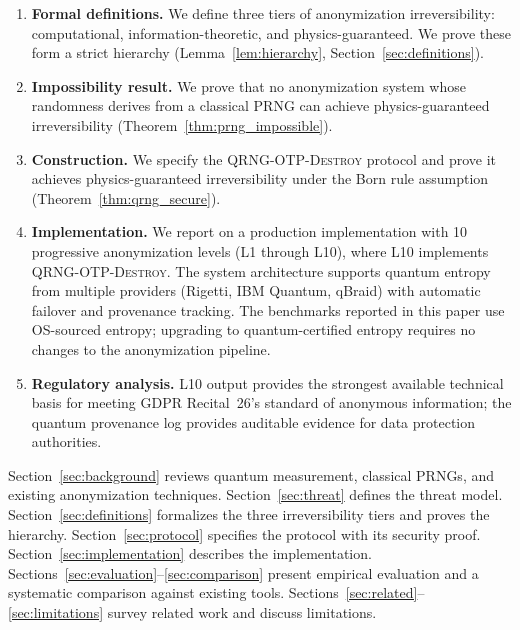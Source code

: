 \documentclass[journal]{IEEEtran}
\begin{document}
\begin{enumerate}
\item \textbf{Formal definitions.} We define three tiers of anonymization irreversibility: computational, information-theoretic, and physics-guaranteed. We prove these form a strict hierarchy (Lemma~\ref{lem:hierarchy}, Section~\ref{sec:definitions}).

\item \textbf{Impossibility result.} We prove that no anonymization system whose randomness derives from a classical PRNG can achieve physics-guaranteed irreversibility (Theorem~\ref{thm:prng_impossible}).

\item \textbf{Construction.} We specify the \textsc{QRNG-OTP-Destroy} protocol and prove it achieves physics-guaranteed irreversibility under the Born rule assumption (Theorem~\ref{thm:qrng_secure}).

\item \textbf{Implementation.} We report on a production implementation with 10 progressive anonymization levels (L1 through L10), where L10 implements \textsc{QRNG-OTP-Destroy}. The system architecture supports quantum entropy from multiple providers (Rigetti, IBM Quantum, qBraid) with automatic failover and provenance tracking. The benchmarks reported in this paper use OS-sourced entropy; upgrading to quantum-certified entropy requires no changes to the anonymization pipeline.

\item \textbf{Regulatory analysis.} L10 output provides the strongest available technical basis for meeting GDPR Recital~26's standard of anonymous information; the quantum provenance log provides auditable evidence for data protection authorities.
\end{enumerate}

Section~\ref{sec:background} reviews quantum measurement, classical PRNGs, and existing anonymization techniques. Section~\ref{sec:threat} defines the threat model. Section~\ref{sec:definitions} formalizes the three irreversibility tiers and proves the hierarchy. Section~\ref{sec:protocol} specifies the protocol with its security proof. Section~\ref{sec:implementation} describes the implementation. Sections~\ref{sec:evaluation}--\ref{sec:comparison} present empirical evaluation and a systematic comparison against existing tools. Sections~\ref{sec:related}--\ref{sec:limitations} survey related work and discuss limitations.

\end{document}
